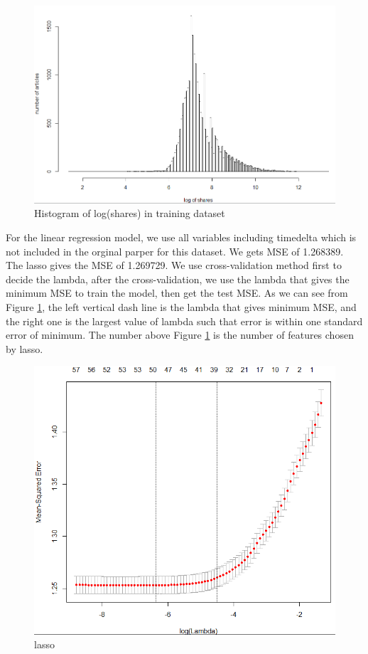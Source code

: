 \documentclass[11pt]{article}
\begin{document}
    \begin{figure}[h]
        \centering
        \includegraphics[width=0.7\linewidth]{logy.png}
        \caption{Histogram of log(shares) in training dataset}
    \end{figure}

For the linear regression model, we use all variables including timedelta which is not included in the orginal parper for this dataset. We gets MSE of 1.268389. \\

The lasso gives the MSE of 1.269729. We use cross-validation method first to decide the lambda, after the cross-validation, we use the lambda that gives the minimum MSE to train the model, then get the test MSE. As we can see from Figure \ref{fig:lasso}, the left vertical dash line is the lambda that gives minimum MSE, and the right one is the largest value of lambda such that error is within one standard error of minimum. The number above Figure \ref{fig:lasso} is the number of features chosen by lasso. \\

    \begin{figure}[h]
        \centering
        \includegraphics[width=0.7\linewidth]{lasso_plot.png}
        \caption{lasso}
        \label{fig:lasso}
    \end{figure}
    
\end{document}
